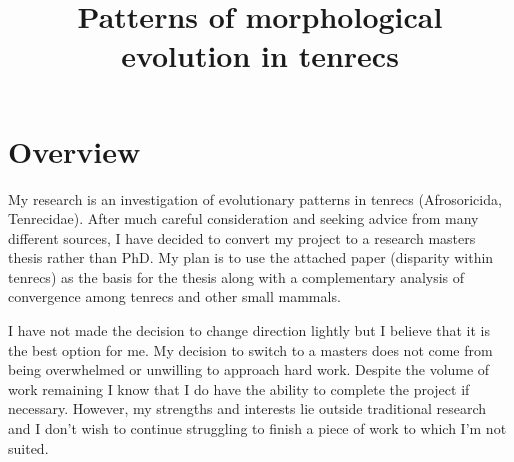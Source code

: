 \documentclass[12pt,a4paper]{article}
\begin{document}
\title{Patterns of morphological evolution in tenrecs}
\author{}
\date{}
\maketitle


\renewcommand{\headrulewidth}{0.0pt}
\thispagestyle{fancy}				%
\chead{}


\section{Overview}



	

	My research is an investigation of evolutionary patterns in tenrecs (Afrosoricida,  Tenrecidae). After much careful consideration and seeking advice from many different sources, I have decided to convert my project to a research masters thesis rather than PhD. My plan is to use the attached paper (disparity within tenrecs) as the basis for the thesis along with a complementary analysis of convergence among tenrecs and other small mammals. 
	
	I have not made the decision to change direction lightly but I believe that it is the best option for me. My decision to switch to a masters does not come from being overwhelmed or unwilling to approach hard work. Despite the volume of work remaining I know that I do have the ability to complete the project if necessary. However, my strengths and interests lie outside traditional research and I don't wish to continue struggling to finish a piece of work to which I'm not suited.
	
\end{document}
